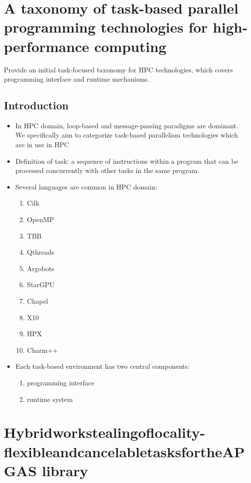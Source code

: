 \documentclass[11pt]{article}
\begin{document}
\section{A taxonomy of task-based parallel programming technologies for high-performance computing \cite{thoman18_taxon_task_based_paral_progr}}
\label{sec-7}

Provide an initial task-focused taxonomy for HPC technologies, which covers programming interface and runtime mechanisms.

\subsection{Introduction}
\label{sec-7-1}
\begin{itemize}
\item In HPC domain, loop-based and message-passing paradigms are dominant. We specifically aim to categorize task-based parallelism technologies which are in use in HPC
\item Definition of task: a sequence of instructions within a program that can be processed concurrently with other tasks in the same program.
\item Several languages are common in HPC domain:
\begin{enumerate}
\item Cilk
\item OpenMP
\item TBB
\item Qthreads
\item Argobots
\item StarGPU
\item Chapel
\item X10
\item HPX
\item Charm++
\end{enumerate}

\item Each task-based environment has two central components:
\begin{enumerate}
\item programming interface
\item runtime system
\end{enumerate}
\end{itemize}




\section{Hybridworkstealingoflocality-flexibleandcancelabletasksfortheAPGAS library  \cite{posner18_hybrid_work_steal_local_flexib}}
\label{sec-8}
\end{document}
